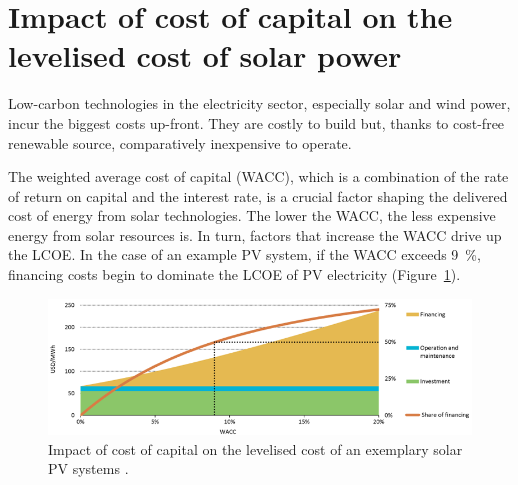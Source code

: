 \section{Impact of cost of capital on the levelised cost of solar power} \label{section WACC}
Low-carbon technologies in the electricity sector, especially solar and wind power, incur the biggest costs up-front. They are costly to build but, thanks to cost-free renewable source, comparatively inexpensive to operate.


The weighted average cost of capital (WACC), which is a combination of the rate of return on capital and the interest rate, is a crucial factor shaping the delivered cost of energy from solar technologies. The lower the WACC, the less expensive energy from solar resources is. In turn, factors that increase the WACC drive up the LCOE. In the case of an example PV system, if the WACC exceeds \SI{9}{\percent}, financing costs begin to dominate the LCOE of PV electricity (Figure~\ref{WACC}).

\begin{figure}[htbp]  
\centering
\includegraphics[width=1\linewidth]{FIG/WACC}
\caption[Impact of cost of capital on the levelised cost of an exemplary solar PV systems.]{Impact of cost of capital on the levelised cost of an exemplary solar PV systems \cite{IEA2015}.}\label{WACC}
\end{figure}

